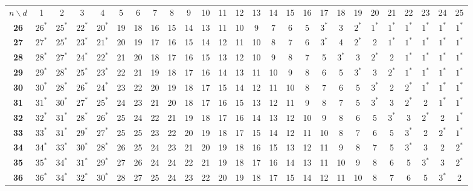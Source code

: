 
\begin{table}
\smaller[2]
\centering
\setlength{\tabcolsep}{4.5pt}
\begin{tabular}{|c| c c c c c c c c c c c c c c c c c c c c c c c c c |}
\hline
$n \backslash  d$ & 1 & 2 & 3 & 4 & 5 & 6 & 7 & 8 & 9 & 10 & 11 & 12 & 13 & 14 & 15 & 16 & 17 & 18 & 19 & 20 & 21 & 22 & 23 & 24 & 25 \\
\Xhline{4\arrayrulewidth}
\textbf{26} & $26^*$ & $25^*$ & $22^*$ & $20^*$ & 19 & 18 & 16 & 15 & 14 & 13 & 11 & 10 & 9 & 7 & 6 & 5 & $3^*$ & 3 & $2^*$ & $1^*$ & $1^*$ & $1^*$ & $1^*$ & $1^*$ & $1^*$ \\
\textbf{27} & $27^*$ & $25^*$ & $23^*$ & $21^*$ & 20 & 19 & 17 & 16 & 15 & 14 & 12 & 11 & 10 & 8 & 7 & 6 & $3^*$ & 4 & $2^*$ & 2 & $1^*$ & $1^*$ & $1^*$ & $1^*$ & $1^*$ \\
\textbf{28} & $28^*$ & $27^*$ & $24^*$ & $22^*$ & 21 & 20 & 18 & 17 & 16 & 15 & 13 & 12 & 10 & 9 & 8 & 7 & 5 & $3^*$ & 3 & $2^*$ & 2 & $1^*$ & $1^*$ & $1^*$ & $1^*$ \\
\textbf{29} & $29^*$ & $28^*$ & $25^*$ & $23^*$ & 22 & 21 & 19 & 18 & 17 & 16 & 14 & 13 & 11 & 10 & 9 & 8 & 6 & 5 & $3^*$ & 3 & $2^*$ & $1^*$ & $1^*$ & $1^*$ & $1^*$ \\
\textbf{30} & $30^*$ & $28^*$ & $26^*$ & $24^*$ & 23 & 22 & 20 & 19 & 18 & 17 & 15 & 14 & 12 & 11 & 10 & 8 & 7 & 6 & 5 & $3^*$ & 2 & $2^*$ & $1^*$ & $1^*$ & $1^*$ \\
\textbf{31} & $31^*$ & $30^*$ & $27^*$ & $25^*$ & 24 & 23 & 21 & 20 & 18 & 17 & 16 & 15 & 13 & 12 & 11 & 9 & 8 & 7 & 5 & $3^*$ & 3 & $2^*$ & 2 & $1^*$ & $1^*$ \\
\textbf{32} & $32^*$ & $31^*$ & $28^*$ & $26^*$ & 25 & 24 & 22 & 21 & 19 & 18 & 17 & 16 & 14 & 13 & 12 & 10 & 9 & 8 & 6 & 5 & $3^*$ & 3 & $2^*$ & 2 & $1^*$ \\
\textbf{33} & $33^*$ & $31^*$ & $29^*$ & $27^*$ & 25 & 25 & 23 & 22 & 20 & 19 & 18 & 17 & 15 & 14 & 12 & 11 & 10 & 8 & 7 & 6 & 5 & $3^*$ & 2 & $2^*$ & $1^*$ \\
\textbf{34} & $34^*$ & $33^*$ & $30^*$ & $28^*$ & 26 & 25 & 24 & 23 & 21 & 20 & 19 & 18 & 16 & 15 & 13 & 12 & 11 & 9 & 8 & 7 & 5 & $3^*$ & 3 & 2 & $2^*$ \\
\textbf{35} & $35^*$ & $34^*$ & $31^*$ & $29^*$ & 27 & 26 & 24 & 24 & 22 & 21 & 19 & 18 & 17 & 16 & 14 & 13 & 11 & 10 & 9 & 8 & 6 & 5 & $3^*$ & 3 & $2^*$ \\
\textbf{36} & $36^*$ & $34^*$ & $32^*$ & $30^*$ & 28 & 27 & 25 & 24 & 23 & 22 & 20 & 19 & 18 & 17 & 15 & 14 & 12 & 11 & 10 & 8 & 7 & 6 & 5 & $3^*$ & 2 \\

\end{tabular}
\end{table}
